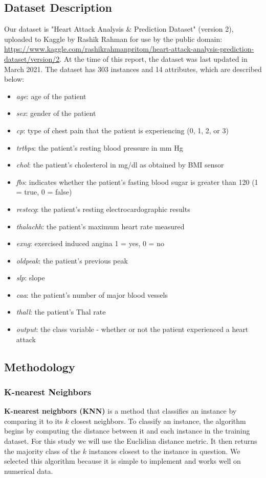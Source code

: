 \documentclass{article}
\begin{document}
\subsection{Dataset Description}
Our dataset is "Heart Attack Analysis \& Prediction Dataset" (version 2), uploaded to Kaggle by Rashik Rahman for use by the public domain: \url{https://www.kaggle.com/rashikrahmanpritom/heart-attack-analysis-prediction-dataset/version/2}. At the time of this report, the dataset was last updated in March 2021. The dataset has 303 instances and 14 attributes, which are described below:
\begin{itemize}
\item \textit{age}: age of the patient
\item \textit{sex}: gender of the patient
\item \textit{cp}: type of chest pain that the patient is experiencing (0, 1, 2, or 3)
\item \textit{trtbps}: the patient's resting blood pressure in mm Hg
\item \textit{chol}: the patient's cholesterol in mg/dl as obtained by BMI sensor
\item \textit{fbs}: indicates whether the patient's fasting blood sugar is greater than 120 (1 = true, 0 = false)
\item \textit{restecg}: the patient's resting electrocardographic results
\item \textit{thalachh}: the patient's maximum heart rate measured
\item \textit{exng}: exercised induced angina {1 = yes, 0 = no}
\item \textit{oldpeak}: the patient's previous peak
\item \textit{slp}: slope
\item \textit{caa}: the patient's number of major blood vessels
\item \textit{thall}: the patient's Thal rate
\item \textit{output}: the class variable - whether or not the patient experienced a heart attack
\end{itemize}

\subsection{Methodology}
\subsubsection{K-nearest Neighbors}
\textbf{K-nearest neighbors (KNN)} is a method that classifies an instance by comparing it to its $k$ closest neighbors. To classify an instance, the algorithm begins by computing the distance between it and each instance in the training dataset. For this study we will use the Euclidian distance metric. It then returns the majority class of the $k$ instances closest to the instance in question. We selected this algorithm because it is simple to implement and works well on numerical data.
\end{document}
